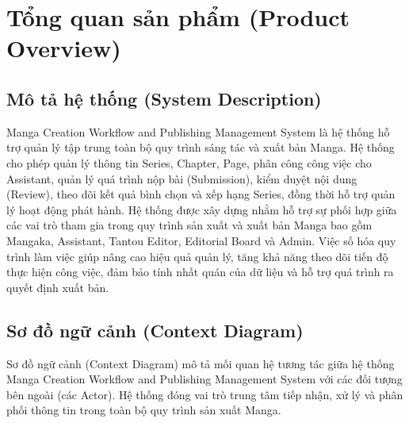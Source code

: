 \section{Tổng quan sản phẩm (Product Overview)}
\label{sec:srs_product_overview}

\subsection{Mô tả hệ thống (System Description)}
\label{subsec:srs_system_description}
Manga Creation Workflow and Publishing Management System là hệ thống hỗ trợ quản lý tập trung toàn bộ quy trình sáng tác và xuất bản Manga. Hệ thống cho phép quản lý thông tin Series, Chapter, Page, phân công công việc cho Assistant, quản lý quá trình nộp bài (Submission), kiểm duyệt nội dung (Review), theo dõi kết quả bình chọn và xếp hạng Series, đồng thời hỗ trợ quản lý hoạt động phát hành. Hệ thống được xây dựng nhằm hỗ trợ sự phối hợp giữa các vai trò tham gia trong quy trình sản xuất và xuất bản Manga bao gồm Mangaka, Assistant, Tantou Editor, Editorial Board và Admin. Việc số hóa quy trình làm việc giúp nâng cao hiệu quả quản lý, tăng khả năng theo dõi tiến độ thực hiện công việc, đảm bảo tính nhất quán của dữ liệu và hỗ trợ quá trình ra quyết định xuất bản.

\subsection{Sơ đồ ngữ cảnh (Context Diagram)}
\label{subsec:srs_context_diagram}

Sơ đồ ngữ cảnh (Context Diagram) mô tả mối quan hệ tương tác giữa hệ thống Manga Creation Workflow and Publishing Management System với các đối tượng bên ngoài (các Actor). Hệ thống đóng vai trò trung tâm tiếp nhận, xử lý và phân phối thông tin trong toàn bộ quy trình sản xuất Manga.

